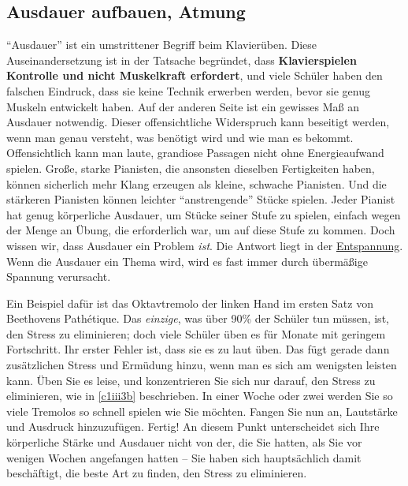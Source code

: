 
\subsection{Ausdauer aufbauen, Atmung}
\label{c1ii21}

\enquote{Ausdauer} ist ein umstrittener Begriff beim Klavierüben.
Diese Auseinandersetzung ist in der Tatsache begründet, dass \textbf{Klavierspielen Kontrolle und nicht Muskelkraft erfordert}, und viele Schüler haben den falschen Eindruck, dass sie keine Technik erwerben werden, bevor sie genug Muskeln entwickelt haben.
Auf der anderen Seite ist ein gewisses Maß an Ausdauer notwendig.
Dieser offensichtliche Widerspruch kann beseitigt werden, wenn man genau versteht, was benötigt wird und wie man es bekommt.
Offensichtlich kann man laute, grandiose Passagen nicht ohne Energieaufwand spielen.
Große, starke Pianisten, die ansonsten dieselben Fertigkeiten haben, können sicherlich mehr Klang erzeugen als kleine, schwache Pianisten.
Und die stärkeren Pianisten können leichter \enquote{anstrengende} Stücke spielen.
Jeder Pianist hat genug körperliche Ausdauer, um Stücke seiner Stufe zu spielen, einfach wegen der Menge an Übung, die erforderlich war, um auf diese Stufe zu kommen.
Doch wissen wir, dass Ausdauer ein Problem \textit{ist}.
Die Antwort liegt in der \hyperref[c1ii14]{Entspannung}.
Wenn die Ausdauer ein Thema wird, wird es fast immer durch übermäßige Spannung verursacht.

Ein Beispiel dafür ist das Oktavtremolo der linken Hand im ersten Satz von Beethovens Pathétique.
Das \textit{einzige}, was über 90\% der Schüler tun müssen, ist, den Stress zu eliminieren; doch viele Schüler üben es für Monate mit geringem Fortschritt.
Ihr erster Fehler ist, dass sie es zu laut üben.
Das fügt gerade dann zusätzlichen Stress und Ermüdung hinzu, wenn man es sich am wenigsten leisten kann.
Üben Sie es leise, und konzentrieren Sie sich nur darauf, den Stress zu eliminieren, wie in \hyperref[c1iii3b]{\autoref{c1iii3b}} beschrieben.
In einer Woche oder zwei werden Sie so viele Tremolos so schnell spielen wie Sie möchten.
Fangen Sie nun an, Lautstärke und Ausdruck hinzuzufügen. Fertig!
An diesem Punkt unterscheidet sich Ihre körperliche Stärke und Ausdauer nicht von der, die Sie hatten, als Sie vor wenigen Wochen angefangen hatten -- Sie haben sich hauptsächlich damit beschäftigt, die beste Art zu finden, den Stress zu eliminieren.

